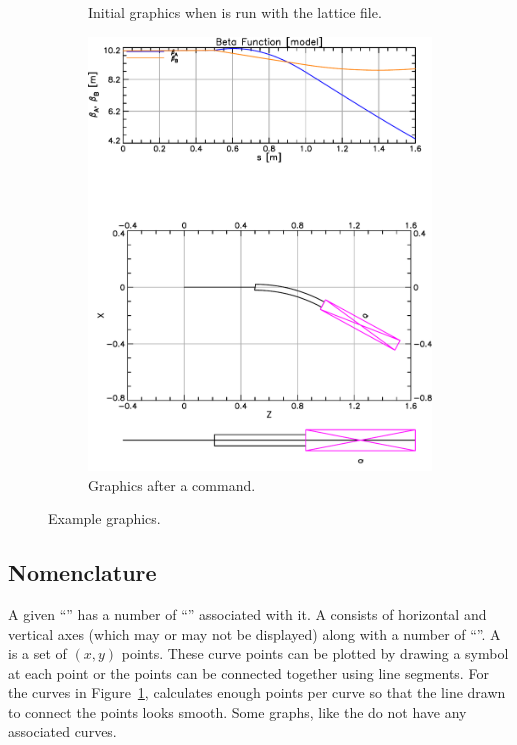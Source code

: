 \documentclass{hitec}     %
\begin{document}
\begin{figure}[hb]
\begin{subfigure}[t]{0.47\textwidth}
    \caption{Initial graphics when \tao is run with the  lattice file.}
    \label{f:lat.init}
  \end{subfigure}
  \hfil
  \begin{subfigure}[t]{0.47\textwidth}
    \includegraphics[width=\textwidth]{lat-floor.pdf}
    \caption{Graphics after a  command.}
    \label{f:lat.floor}
  \end{subfigure}
  \caption{Example \tao graphics.}
\end{figure}

\vfill
\newpage

\subsection{Nomenclature}


A given ``'' has a number of ``'' associated with it. A  consists of
horizontal and vertical axes (which may or may not be displayed) along with a number of
``''.  A  is a set of $(x, y)$ points. These curve points can be plotted by drawing
a symbol at each point or the points can be connected together using line segments. For the curves in
Figure~\ref{f:lat.init}, \tao calculates enough points per curve so that the line drawn to connect
the points looks smooth. Some graphs, like the  do not have any associated curves.
\end{document}

